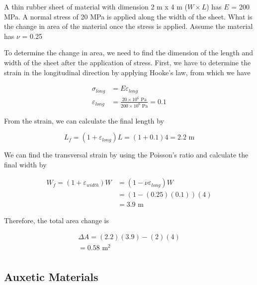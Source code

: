 \documentclass[
fontsize=10pt,
a4paper,
twosides=false,
open=any,
svgnames,
]{kaobook} %
\begin{document}
\begin{example}
  A thin rubber sheet of material with dimension 2 m x 4 m ($W \times L$) has $E$ = 200 MPa. A normal stress of 20 MPa is applied along the width of the sheet. What is the change in area of the material once the stress is applied. Assume the material has $\nu$ = 0.25

  To determine the change in area, we need to find the dimension of the length and width of the sheet after the application of stress. First, we have to determine the strain in the longitudinal direction by applying Hooke’s law, from which we have

  \begin{align*}
    \sigma _{long} &= E{\varepsilon _{long}} \\
    \varepsilon _{long} &= \frac{20 \times 10^6 \text{ Pa}}{200 \times 10^6 \text{ Pa}} = 0.1
  \end{align*}

  From the strain, we can calculate the final length by

  \[{L_f} = (1 + {\varepsilon _{long}}){L} = (1 + 0.1)4 = 2.2 \text{ m}\]

  We can find the transversal strain by using the Poisson’s ratio and calculate the final width by

  \begin{align*}
    W_{f} = (1 + {\varepsilon _{width}})W & = (1 - \nu {\varepsilon _{long}})W \\
                                          & = (1 - (0.25)(0.1))(4) \\
                                          &= 3.9 \text{ m}
  \end{align*}

  Therefore, the total area change is

  \[\begin{gathered}
      \Delta A = (2.2)(3.9) - (2)(4) \\
      = 0.58 \text{ m}^2 \\
    \end{gathered} \]
\end{example}

\subsection{Auxetic Materials}
\end{document}

